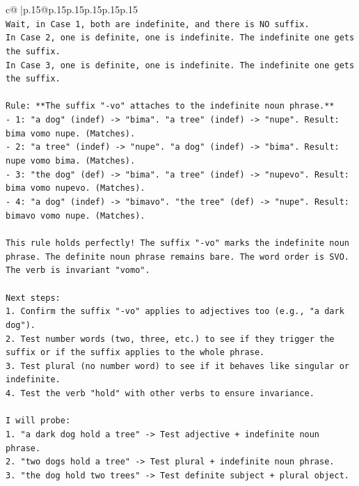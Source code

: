 \documentclass{article}
\begin{document}
{\begin{supertabular}{c@{$\;$}|p{.15\linewidth}@{}p{.15\linewidth}p{.15\linewidth}p{.15\linewidth}p{.15\linewidth}p{.15\linewidth}}
{{{\\ 
\texttt{Wait, in Case 1, both are indefinite, and there is NO suffix.} \\
\texttt{In Case 2, one is definite, one is indefinite. The indefinite one gets the suffix.} \\
\texttt{In Case 3, one is definite, one is indefinite. The indefinite one gets the suffix.} \\
\\ 
\texttt{Rule: **The suffix "{-}vo" attaches to the indefinite noun phrase.**} \\
\texttt{{-} 1: "a dog" (indef) {-}> "bima". "a tree" (indef) {-}> "nupe". Result: bima vomo nupe. (Matches).} \\
\texttt{{-} 2: "a tree" (indef) {-}> "nupe". "a dog" (indef) {-}> "bima". Result: nupe vomo bima. (Matches).} \\
\texttt{{-} 3: "the dog" (def) {-}> "bima". "a tree" (indef) {-}> "nupevo". Result: bima vomo nupevo. (Matches).} \\
\texttt{{-} 4: "a dog" (indef) {-}> "bimavo". "the tree" (def) {-}> "nupe". Result: bimavo vomo nupe. (Matches).} \\
\\ 
\texttt{This rule holds perfectly! The suffix "{-}vo" marks the indefinite noun phrase. The definite noun phrase remains bare. The word order is SVO. The verb is invariant "vomo".} \\
\\ 
\texttt{Next steps:} \\
\texttt{1. Confirm the suffix "{-}vo" applies to adjectives too (e.g., "a dark dog").} \\
\texttt{2. Test number words (two, three, etc.) to see if they trigger the suffix or if the suffix applies to the whole phrase.} \\
\texttt{3. Test plural (no number word) to see if it behaves like singular or indefinite.} \\
\texttt{4. Test the verb "hold" with other verbs to ensure invariance.} \\
\\ 
\texttt{I will probe:} \\
\texttt{1. "a dark dog hold a tree" {-}> Test adjective + indefinite noun phrase.} \\
\texttt{2. "two dogs hold a tree" {-}> Test plural + indefinite noun phrase.} \\
\texttt{3. "the dog hold two trees" {-}> Test definite subject + plural object.} \\
}}}
\end{supertabular}}
\end{document}
